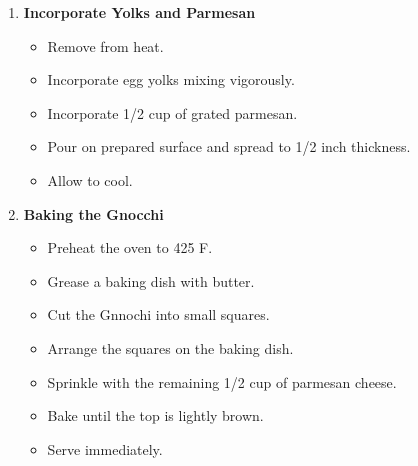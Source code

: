 \documentclass [11pt, letterpaper] {article}
\begin{document}
\begin{description}
\begin{enumerate}
	\item {\bf Incorporate Yolks and Parmesan}
	\begin{itemize}
	\item Remove from heat.
	\item Incorporate egg yolks mixing vigorously.
	\item Incorporate 1/2 cup of grated parmesan.
	\item Pour on prepared surface and spread to 1/2 inch thickness.
	\item Allow to cool.
	\end{itemize}

	\item {\bf Baking the Gnocchi}
	\begin{itemize}
	\item Preheat the oven to 425 F.
	\item Grease a baking dish with butter.
	\item Cut the Gnnochi into small squares.
	\item Arrange the squares on the baking dish.
	\item Sprinkle with the remaining 1/2 cup of parmesan cheese.
	\item Bake until the top is lightly brown.
	\item Serve immediately.
	\end{itemize}

	\end{enumerate}
\end{description}
\end{document}
